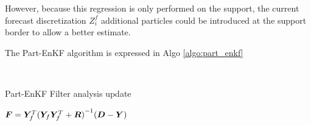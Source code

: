 However, because this regression is only performed on the support, the current forecast discretization $Z^f_i$ additional particles could be introduced at the support border to allow a better estimate.

The Part-EnKF algorithm is expressed in Algo \ref{algo:part_enkf}
\begin{algorithm}~\label{algo:part_enkf}
    \caption{Part-EnKF Filter analysis update}

    $ \bm{F} = \bm Y_f^T {(\bm Y_f \bm Y_f^T + \bm R)}^{-1}(\bm{D} - \bm{Y})$ 

\end{algorithm}

